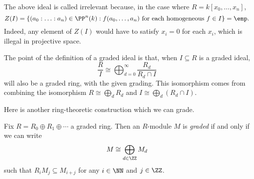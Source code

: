 \begin{remark}
	The above ideal is called irrelevant because, in the case where $R=k[x_0,\ldots,x_n]$,
	\[Z(I)=\left\{(a_0:\ldots:a_n)\in\PP^n(k):f(a_0,\ldots,a_n)\text{ for each homogeneous }f\in I\right\}=\emp.\]
	Indeed, any element of $Z(I)$ would have to satisfy $x_i=0$ for each $x_i$, which is illegal in projective space.
\end{remark}
The point of the definition of a graded ideal is that, when $I\subseteq R$ is a graded ideal,
\[\frac RI\cong\bigoplus_{d=0}^\infty\frac{R_d}{R_d\cap I}\]
will also be a graded ring, with the given grading. This isomorphism comes from combining the isomorphism $R\cong\bigoplus_dR_d$ and $I\cong\bigoplus_d(R_d\cap I)$.

Here is another ring-theoretic construction which we can grade.
\begin{definition}
	Fix $R=R_0\oplus R_1\oplus\cdots$ a graded ring. Then an $R$-module $M$ is \textit{graded} if and only if we can write
	\[M\cong\bigoplus_{d\in\ZZ}M_d\]
	such that $R_iM_j\subseteq M_{i+j}$ for any $i\in\NN$ and $j\in\ZZ$.
\end{definition}

